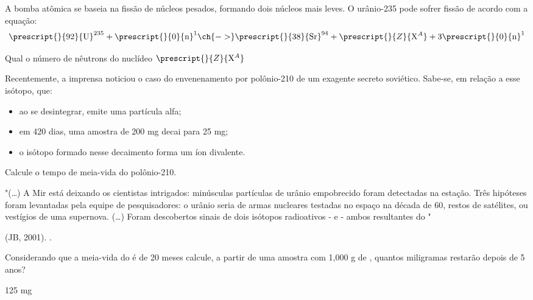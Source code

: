\documentclass[9 pt]{scrartcl}
\def\PQA{2.0} %
\begin{document}
\begin{exercise}[points=\PQA]
A bomba atômica se baseia na fissão de núcleos pesados, formando dois núcleos mais leves. O urânio-235 pode sofrer fissão de acordo com a equação:
\begin{equation*}
\prescript{}{92}{\mathrm{U}}^{235} + \prescript{}{0}{\mathrm{n}}^1 \ch{->} \prescript{}{38}{\mathrm{Sr}}^{94} + \prescript{}{Z}{\mathrm{X}^A} + 3 \prescript{}{0}{\mathrm{n}}^1
\end{equation*}

Qual o número de nêutrons do nuclídeo \(\prescript{}{Z}{\mathrm{X}^A}\)

\blank[blank-style={\phantom{#1}},width=8\linewidth]{}
\end{exercise}




\begin{exercise}[points=\PQA]
Recentemente, a imprensa noticiou o caso do envenenamento por polônio-210 de um exagente secreto soviético. Sabe-se, em relação a esse isótopo, que:

\begin{itemize}
\item ao se desintegrar, emite uma partícula alfa;
\item em 420 dias, uma amostra de 200 mg decai para 25 mg;
\item o isótopo formado nesse decaimento forma um íon divalente.
\end{itemize}

Calcule o tempo de meia-vida do polônio-210.

\blank[blank-style={\phantom{#1}},width=8\linewidth]{}
\end{exercise}


\begin{exercise}[points=\PQA]
"(\ldots{}) A Mir está deixando os cientistas intrigados: minúsculas partículas de urânio empobrecido foram detectadas na estação. Três hipóteses foram levantadas pela equipe de pesquisadores: o urânio seria de armas nucleares testadas no espaço na década de 60, restos de satélites, ou vestígios de uma supernova. (\ldots{}) Foram descobertos sinais de dois isótopos radioativos -  e  - ambos resultantes do "

(JB, 2001).
.

Considerando que a meia-vida do  é de 20 meses calcule, a partir de uma amostra com 1,000 g de , quantos miligramas restarão depois de 5 anos? 



\blank[blank-style={\phantom{#1}},width=8\linewidth]{}
\end{exercise}
\begin{solution}
125 mg
\end{solution}




\end{document}
